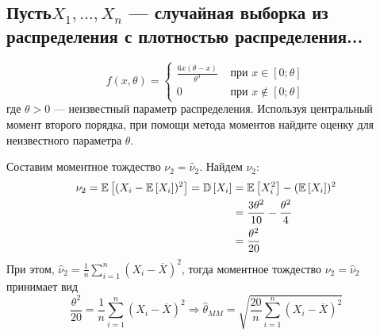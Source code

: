 \documentclass{article}
\begin{document}
\subsection{Пусть$ X_1, \ldots, X_n$ — случайная выборка из распределения с плотностью распределения...}
\begin{equation*}
    f(x, \theta)= \begin{cases}\frac{6 x(\theta-x)}{\theta^{3}} & \text { при } x \in[0 ; \theta] \\ 0 & \text { при } x \notin[0 ; \theta]\end{cases}
\end{equation*}
где $\theta>0$ — неизвестный параметр распределения. Используя центральный момент второго порядка, при помощи метода моментов найдите оценку для неизвестного параметра $\theta$.

Составим моментное тождество $\nu_2=\widehat{\nu}_2$. Найдем $\nu_2$:
\begin{equation*}
    \begin{aligned}
        \nu_2=\mathbb{E}\left[(X_i-\mathbb{E}\left[X_i\right])^2\right]=\mathbb{D}\left[X_i\right]&=\mathbb{E}\left[X_i^2\right]-(\mathbb{E}\left[X_i\right])^2\\
        &=\frac{3\theta^2}{10}-\frac{\theta^2}{4}\\
        &=\frac{\theta^2}{20}
    \end{aligned}
\end{equation*}
При этом, $\widehat{\nu}_2=\frac{1}{n}\sum_{i=1}^{n}(X_i-\overline{X})^2$, тогда моментное тождество $\nu_2=\widehat{\nu}_2$ принимает вид
\begin{equation*}
    \frac{\theta^2}{20}=\frac{1}{n}\sum_{i=1}^{n}(X_i-\overline{X})^2\Longrightarrow\widehat{\theta}_{MM}=\sqrt{\frac{20}{n}\sum_{i=1}^n(X_i-\overline{X})^2}
\end{equation*}

\end{document}
